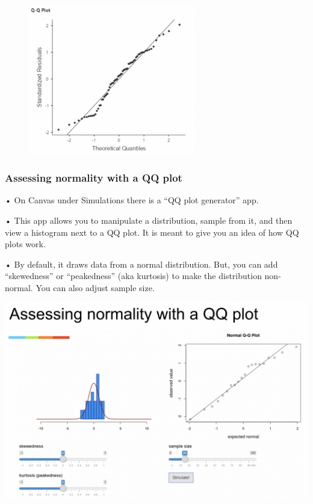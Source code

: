 \documentclass[
  letterpaper,
  DIV=11,
  numbers=noendperiod]{scrreprt}
\begin{document}
\begin{figure}

{\centering \includegraphics[width=2.85417in,height=\textheight]{images/mod4_pt1_7.png}

}

\end{figure}

\hypertarget{assessing-normality-with-a-qq-plot}{%
\subsubsection{Assessing normality with a QQ
plot}\label{assessing-normality-with-a-qq-plot}}

• On Canvas under Simulations there is a ``QQ plot generator'' app.

• This app allows you to manipulate a distribution, sample from it, and
then view a histogram next to a QQ plot. It is meant to give you an idea
of how QQ plots work.

• By default, it draws data from a normal distribution. But, you can add
``skewedness'' or ``peakedness'' (aka kurtosis) to make the distribution
non-normal. You can also adjust sample size.

\includegraphics{images/mod4_pt1_8.png}
\end{document}
